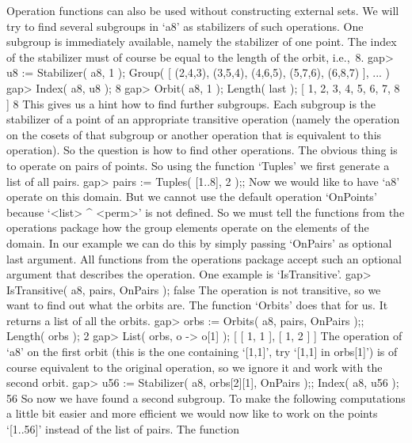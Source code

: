 
Operation functions can also be  used without constructing external sets.
We will try to   find several subgroups  in `a8'  as stabilizers of  such
operations. One subgroup is immediately  available, namely the stabilizer
of one point. The index of the stabilizer must of course  be equal to the
length of the orbit, i.e.,~8.
\beginexample
    gap> u8 := Stabilizer( a8, 1 );
    Group( [ (2,4,3), (3,5,4), (4,6,5), (5,7,6), (6,8,7) ], ... )
    gap> Index( a8, u8 );
    8
    gap> Orbit( a8, 1 ); Length( last );
    [ 1, 2, 3, 4, 5, 6, 7, 8 ]
    8
\endexample
This gives us a hint how to find further  subgroups. Each subgroup is the
stabilizer of a point of an appropriate  transitive operation (namely the
operation  on  the cosets of that  subgroup  or another operation that is
equivalent to  this operation).  So the question   is how  to find  other
operations. The obvious thing is to operate  on pairs of points. So using
the function `Tuples' we first generate a list of all pairs.
\beginexample
    gap> pairs := Tuples( [1..8], 2 );;
\endexample
Now we would like to have `a8' operate on this  domain. But we cannot use
the  default operation `OnPoints'  because    `<list> ^ <perm>' is    not
defined. So we  must tell the functions  from the operations package  how
the group elements operate on the elements of  the domain. In our example
we can do this by simply passing `OnPairs' as optional last argument. All
functions  from the operations package  accept  such an optional argument
that describes the operation. One example is `IsTransitive'.
\beginexample
    gap> IsTransitive( a8, pairs, OnPairs );
    false 
\endexample
The operation is not transitive,  so we want to  find out what the orbits
are. The function `Orbits' does that for us. It returns a list of all the
orbits.
\beginexample
    gap> orbs := Orbits( a8, pairs, OnPairs );; Length( orbs );
    2
    gap> List( orbs, o -> o[1] );
    [ [ 1, 1 ], [ 1, 2 ] ]
\endexample
The operation of `a8'   on the first  orbit (this  is the one  containing
`[1,1]', try `[1,1] in orbs[1]') is of  course equivalent to the original
operation, so we ignore it and work with the second orbit.
\beginexample
    gap> u56 := Stabilizer( a8, orbs[2][1], OnPairs );; Index( a8, u56 );
    56 
\endexample
So   now   we have  found   a  second subgroup.   To   make the following
computations a little bit easier and more efficient  we would now like to
work on the points `[1..56]'  instead of the list  of pairs. The function
